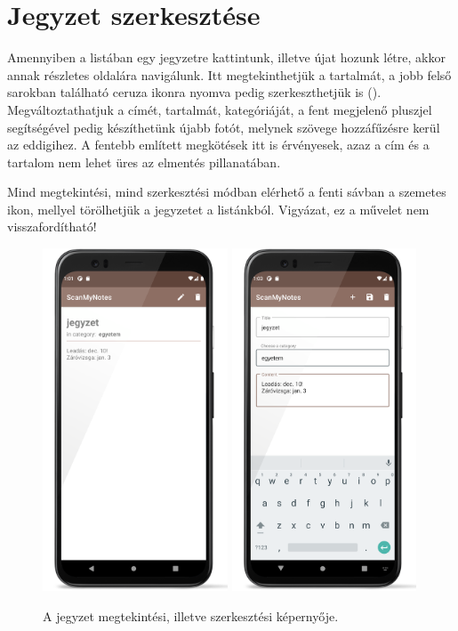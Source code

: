 \section{Jegyzet szerkesztése}
Amennyiben a listában egy jegyzetre kattintunk, illetve újat hozunk létre, akkor annak részletes oldalára navigálunk. Itt megtekinthetjük a tartalmát, a jobb felső sarokban található ceruza ikonra nyomva pedig szerkeszthetjük is (). Megváltoztathatjuk a címét, tartalmát, kategóriáját, a fent megjelenő pluszjel segítségével pedig készíthetünk újabb fotót, melynek szövege hozzáfűzésre kerül az eddigihez. A fentebb említett megkötések itt is érvényesek, azaz a cím és a tartalom nem lehet üres az elmentés pillanatában.

Mind megtekintési, mind szerkesztési módban elérhető a fenti sávban a szemetes ikon, mellyel törölhetjük a jegyzetet a listánkból. Vigyázat, ez a művelet nem visszafordítható!

\begin{figure}[!ht]
	\centering
	\includegraphics[width=55mm, keepaspectratio]{figures/note_view.png}
	\includegraphics[width=55mm, keepaspectratio]{figures/note_edit.png}
	\caption{A jegyzet megtekintési, illetve szerkesztési képernyője.}
	\label{fig:NoteDetailsScreen}
\end{figure}
\newpage

